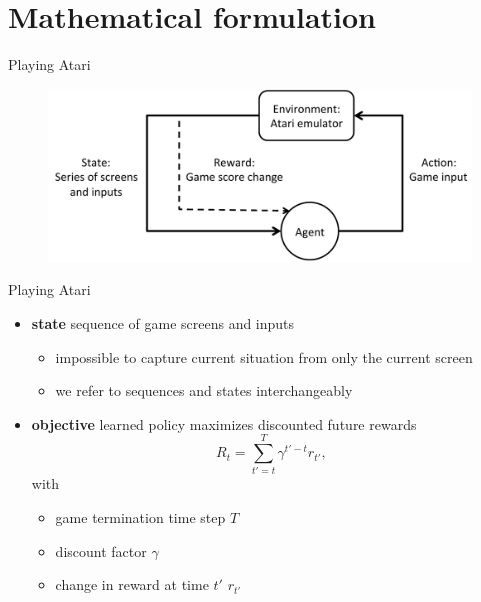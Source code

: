 \section{Mathematical formulation}

\begin{frame}{Playing Atari}
    \begin{figure}
        \centering
        \includegraphics[width=\textwidth]{background.pdf}
    \end{figure}
\end{frame}

\begin{frame}{Playing Atari}
    \begin{itemize}\itemsep=12pt

        \item \textbf{state} sequence of game screens and inputs
        \vspace*{0.5em}
        \begin{itemize}
            \item impossible to capture current situation from only the current screen
            \item we refer to sequences and states interchangeably
        \end{itemize}

        \item \textbf{objective} learned policy maximizes discounted future rewards
        \[
            R_{t} = \sum_{t'=t}^{T} \gamma^{t'-t}r_{t'},
        \]
        with
        \vspace*{0.5em}
        \begin{itemize}
            \item game termination time step $T$
            \item discount factor $\gamma$
            \item change in reward at time $t'$ $r_{t'}$
        \end{itemize}

    \end{itemize}
\end{frame}

